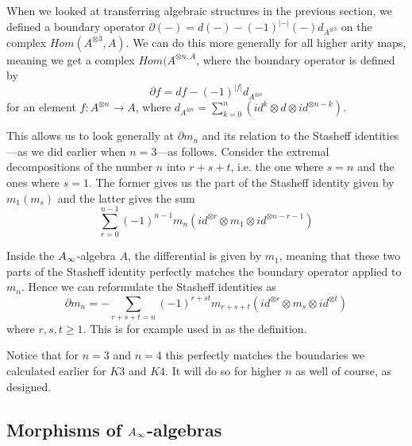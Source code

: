 When we looked at transferring algebraic structures in the previous section, we defined a boundary operator $\partial (-) = d(-)-(-1)^{|-|}(-)d_{A^{\otimes 3}}$ on the complex $Hom(A^{\otimes 3}, A)$. We can do this more generally for all higher arity maps, meaning we get a complex $Hom(A^{\otimes n, A}$, where the boundary operator is defined by
\begin{equation*}
    \partial f = df -(-1)^{|f|}d_{A^{\otimes n}}
\end{equation*}
for an element $f\colon A^{\otimes n}\longrightarrow A$, where $d_{A^{\otimes n}}= \sum_{k=0}^{n}(id^{k}\otimes d\otimes id^{\otimes n-k})$. 

This allows us to look generally at $\partial m_n$ and its relation to the Stasheff identities---as we did earlier when $n=3$---as follows. Consider the extremal decompositions of the number $n$ into $r+s+t$, i.e. the one where $s=n$ and the ones where $s=1$. The former gives us the part of the Stasheff identity given by $m_1(m_s)$ and the latter gives the sum 
\begin{equation*}
    \sum_{r=0}^{n-1} (-1)^{n-1}m_n(id^{\otimes r}\otimes m_1\otimes id^{\otimes n-r-1})
\end{equation*}

Inside the $A_{\infty}$-algebra $A$, the differential is given by $m_1$, meaning that these two parts of the Stasheff identity perfectly matches the boundary operator applied to $m_n$. Hence we can reformulate the Stasheff identities as
\begin{equation*}
    \partial m_n = - \sum_{r+s+t=n}(-1)^{r+st}m_{r+s+t}(id^{\otimes r}\otimes m_s\otimes id^{\otimes t})
\end{equation*}
where $r,s,t\geq 1$. This is for example used in \cite{AHO} as the definition. 

Notice that for $n=3$ and $n=4$ this perfectly matches the boundaries we calculated earlier for $K3$ and $K4$. It will do so for higher $n$ as well of course, as designed. 


\subsection{Morphisms of \texorpdfstring{$A_{\infty}$}{A}-algebras}
\label{ssec:A_infinity-morphisms}



